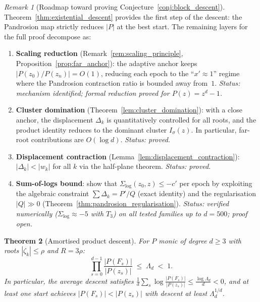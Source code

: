 \documentclass[10pt,a4paper,oneside]{book}
\newtheorem{theorem}{Theorem}[chapter]
\theoremstyle{definition}
\theoremstyle{remark}
\newtheorem{remark}[theorem]{Remark}
\begin{document}
\begin{remark}[Roadmap toward proving Conjecture~\ref{conj:block_descent}]
\label{rem:roadmap}
Theorem~\ref{thm:existential_descent} provides the first step of the descent: the Pandrosion map strictly reduces $|P|$ at the best start.  The remaining layers for the full proof decompose as:
\begin{enumerate}
  \item \textbf{Scaling reduction} (Remark~\ref{rem:scaling_principle}, Proposition~\ref{prop:far_anchor}): the adaptive anchor keeps $|P(z_0)/P(z_n)| = O(1)$, reducing each epoch to the ``$x' \approx 1$'' regime where the Pandrosion contraction ratio is bounded away from~$1$.  \emph{Status: mechanism identified; formal reduction proved for $P(z) = z^d - 1$.}
  \item \textbf{Cluster domination} (Theorem~\ref{lem:cluster_domination}): with a close anchor, the displacement $\Delta_k$ is quantitatively controlled for all roots, and the product identity reduces to the dominant cluster $I_\sigma(z)$.  In particular, far-root contributions are $O(\log d)$.  \emph{Status: proved.}
  \item \textbf{Displacement contraction} (Lemma~\ref{lem:displacement_contraction}): $|\Delta_k| < |w_k|$ for all $k$ via the half-plane theorem.  \emph{Status: proved.}
  \item \textbf{Sum-of-logs bound}: show that $\Sigma_{\log}(z_0,z) \leq -c'$ per epoch by exploiting the algebraic constraint $\sum \Delta_k = P'/Q$ (exact identity) and the regularisation $|Q| \gg 0$ (Theorem~\ref{thm:pandrosion_regularisation}).  \emph{Status: verified numerically ($\Sigma_{\log} \approx -5$ with $T_3$) on all tested families up to $d = 500$; proof open.}
\end{enumerate}
\end{remark}

\begin{theorem}[Amortised product descent]
\label{thm:amortised_product}
For $P$ monic of degree $d \geq 3$ with roots $|\zeta_k| \leq \rho$ and $R = 3\rho$:
\begin{equation}
\label{eq:amortised}
  \prod_{s=0}^{d-1} \frac{|P(F_s)|}{|P(z_s)|} \;\leq\; \Lambda_d \;<\; 1.
\end{equation}
In particular, the average descent satisfies $\frac{1}{d}\sum_s\log\frac{|P(F_s)|}{|P(z_s)|} \leq \frac{\log\Lambda_d}{d} < 0$, and at least one start achieves $|P(F_s)| < |P(z_s)|$ with descent at least $\Lambda_d^{1/d}$.
\end{theorem}
\end{document}
